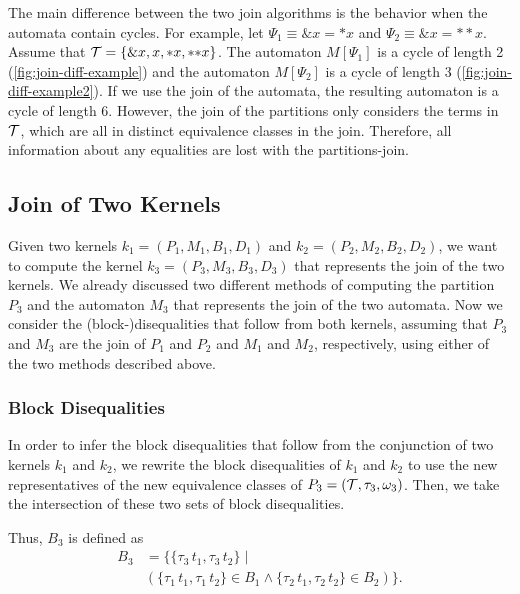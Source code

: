 \begin{example}
    The main difference between the two join algorithms is the behavior when the automata contain cycles.
    For example, let $\Psi_1 \equiv \&x = *x$ and $\Psi_2 \equiv \&x = {*}{*}x$.
    Assume that $\mathcal{T} = \{\&x, x, *x, {*}{*}x\}$.
    The automaton $M[\Psi_1]$ is a cycle of length 2 (\cref{fig:join-diff-example}) and the automaton $M[\Psi_2]$ is a cycle of length 3 (\cref{fig:join-diff-example2}).
    If we use the join of the automata, the resulting automaton is a cycle of length 6.
    However, the join of the partitions only considers the terms in $\mathcal{T}$, which are all in distinct equivalence classes in the join.
    Therefore, all information about any equalities are lost with the partitions-join.

\end{example}

\subsection{Join of Two Kernels}

Given two kernels $k_1 = (P_1, M_1,B_1, D_1)$ and $k_2 = (P_2, M_2,B_2, D_2)$, we want to compute the kernel $k_3 = (P_3, M_3,B_3, D_3)$ that represents the join of the two kernels.
We already discussed two different methods of computing the partition $P_3$ and the automaton $M_3$ that represents the join of the two automata.
Now we consider the (block-)disequalities that follow from both kernels,
assuming that $P_3$ and $M_3$ are the join of $P_1$ and $P_2$ and $M_1$ and $M_2$, respectively,
using either of the two methods described above.

\subsubsection{Block Disequalities}

In order to infer the block disequalities that follow from the conjunction of two kernels $k_1$ and $k_2$,
we rewrite the block disequalities of $k_1$ and $k_2$ to use the new representatives of the new equivalence classes of $P_3 = (\mathcal{T}, \tau_3, \omega_3)$.
Then, we take the intersection of these two sets of block disequalities.

Thus, $B_3$ is defined as
\[
    \begin{array}{ll}
        B_3 & = \{\{\tau_3\,t_1, \tau_3\,t_2\}  \mid                                                \\
            & (\{\tau_1\,t_1, \tau_1\,t_2\} \in B_1 \land \{\tau_2\,t_1, \tau_2\,t_2\} \in B_2) \}.
    \end{array}
\]

